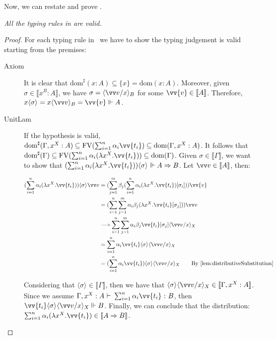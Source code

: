 \documentclass[runningheads,orivec,envcountsame,envcountsect]{llncs}
\newcommand\lra{\longrightarrow}
\newcommand\ansubst[2]{\ensuremath{\langle #1 \rangle_{#2}}}
\newcommand\dom[1]{\mathrm{dom}(#1)}
\newcommand\sdom[1]{\mathrm{dom}^{\sharp}(#1)}
\newcommand\FV[1]{\mathrm{FV}(#1)}
\def\Lam#1#2#3{\lambda#1^{#2}{.}#3} %
\def\Arr{\Rightarrow}
\def\sem#1{\llbracket#1\rrbracket}
\def\TYP#1#2#3{#1~{\vdash}~#2~{:}~#3}
\def\real{\Vdash}
\begin{document}
Now, we can restate and prove .
\begin{restatetheorem}
  \itshape
  All the typing rules in  are valid.
\end{restatetheorem}
\begin{proof}
    For each typing rule in ~we have to show the typing judgement is valid starting from the premises:
    \begin{description}
    \item[Axiom] It is clear that $\sdom{x:A}\subseteq\{x\}=\dom{x:A}$. Moreover, given $\sigma\in\sem{x^B:A}$, we have $\sigma=\ansubst{\vv v/x}{B}$ for some $\vv{v}\in\sem{A}$. Therefore, $x\ansubst{\sigma}{}=x\ansubst{\vv v}{B}=\vv{v}\real A$.
    
    \item[UnitLam] If the hypothesis is valid, $\sdom{\Gamma,x^X:A}\subseteq \FV{\sum_{i=1}^{n}\alpha_i \vv{t_i}}\subseteq \dom{\Gamma,x^X:A}$. It follows that $\sdom{\Gamma}\subseteq \FV{\sum_{i=1}^{n}\alpha_i (\Lam{x}{X}{\vv{t_i}})}\subseteq \dom{\Gamma}$. Given $\sigma\in\sem{\Gamma}$, we want to show that $(\sum_{i=1}^{n}\alpha_i (\Lam{x}{X}{\vv{t_i}}))\ansubst{\sigma}{}\real A\Arr B$. Let $\vv v\in\sem{A}$, then:
    
    \begin{align*}
        (\sum_{i=1}^{n} \alpha_i(\Lam{x}{X}{\vv{t_i}}))\ansubst{\sigma}{} \vv v&= (\sum_{j=1}^{m} \beta_j (\sum_{i=1}^{n} \alpha_i (\Lam{x}{X}{\vv{t_i}}) [\sigma_i])) \vv{v} \\
        &= (\sum_{i=1}^{n}\sum_{j=1}^{m}\alpha_i\beta_j (\Lam{x}{X}{\vv{t_i}[\sigma_j]}))\vv v\\
        &\lra \sum_{i=1}^{n}\sum_{j=1}^{m}\alpha_i\beta_j \vv{t_i}[\sigma_j]\ansubst{\vv v/x}{X}\\
        &=\sum_{i=1}^{n}\alpha_i \vv{t_i}\ansubst{\sigma}{}\ansubst{\vv v/x}{X}\\
        &=(\sum_{i=1}^{n}\alpha_i \vv{t_i})\ansubst{\sigma}{}\ansubst{\vv v/x}{X}\qquad{\text{By \Cref{lem:distributiveSubstitution}}}
    \end{align*}
    
    Considering that $\ansubst{\sigma}{}\in\sem{\Gamma}$, then we have that $\ansubst{\sigma}{}\ansubst{\vv v/x}{X}\in\sem{\Gamma,x^X:A}$. Since we assume $\TYP{\Gamma, x^X:A}{\sum_{i=1}^{n}\alpha_i\vv{t_i}}{B}$, then $\vv{t_i}\ansubst{\sigma}{}\ansubst{\vv v/x}{X}\real B$. Finally, we can conclude that the distribution: $\sum_{i=1}^{n}\alpha_i (\Lam{x}{X}{\vv{t_i}})\in\sem{A\Arr B}$.


\end{description}
\end{proof}
\end{document}
